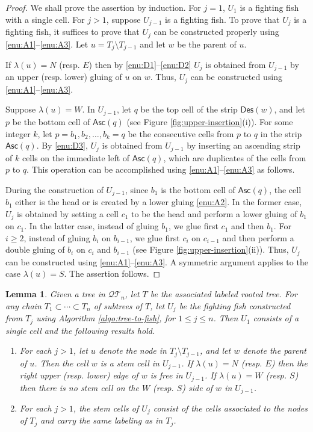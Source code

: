 \documentclass[a4paper,11pt,reqno]{amsart}
\newtheorem{lem}{Lemma}[section]
\theoremstyle{definition}
\numberwithin{equation}{section}
\newcommand{\Des}{{\textsf{Des}}}
\newcommand{\Asc}{{\textsf{Asc}}}
\newcommand{\QT}{{\mathcal{QT}}}
\begin{document}
\begin{proof} We shall prove the assertion by induction. For $j=1$, $U_1$ is a fighting fish with a single cell. For $j>1$, suppose $U_{j-1}$ is a fighting fish. To prove that $U_j$ is a fighting fish, it suffices to prove that $U_j$ can be constructed properly using \ref{enu:A1}--\ref{enu:A3}. Let $u=T_j\setminus T_{j-1}$ and let $w$ be the parent of $u$.

If $\lambda(u)=N$ (resp. $E$) then by \ref{enu:D1}--\ref{enu:D2} $U_j$ is obtained from $U_{j-1}$ by an upper (resp. lower) gluing of $u$ on $w$. Thus, $U_j$ can be constructed using \ref{enu:A1}--\ref{enu:A3}. 

Suppose $\lambda(u)=W$. In $U_{j-1}$, let $q$ be the top cell of the strip $\Des(w)$, and let $p$ be the bottom cell of $\Asc(q)$ (see Figure \ref{fig:upper-insertion}(i)). For some integer $k$, let $p=b_1, b_2,\dots, b_k=q$ be the consecutive cells from $p$ to $q$ in the strip $\Asc(q)$. By \ref{enu:D3}, $U_j$ is obtained from $U_{j-1}$ by inserting an ascending strip of $k$ cells on the immediate left of $\Asc(q)$, which are duplicates of the cells from $p$ to $q$. This operation can be accomplished using \ref{enu:A1}--\ref{enu:A3} as follows.

During the construction of $U_{j-1}$, since $b_1$ is the bottom cell of $\Asc(q)$, the cell $b_1$ either is the head or is created by a lower gluing \ref{enu:A2}. In the former case, $U_j$ is obtained by setting a cell $c_1$ to be the head and perform a lower gluing of $b_1$ on $c_1$. In the latter case, instead of gluing $b_1$, we glue first $c_1$ and then $b_1$. For $i\ge 2$, instead of gluing $b_i$ on $b_{i-1}$, we glue first $c_i$ on $c_{i-1}$ and then perform a double gluing of $b_i$ on $c_i$ and $b_{i-1}$ (see Figure \ref{fig:upper-insertion}(ii)).
Thus, $U_j$ can be constructed using \ref{enu:A1}--\ref{enu:A3}. A symmetric argument applies to the case $\lambda(u)=S$. The assertion follows.
\end{proof}



\begin{lem} \label{lem:cell-union}
Given a tree in $\QT_n$, let $T$ be the associated labeled rooted tree. For any chain $T_1\subset \cdots\subset T_n$ of subtrees of $T$, let $U_j$ be the fighting fish constructed from $T_j$ using Algorithm \ref{algo:tree-to-fish}, for $1\le j\le n$. Then $U_1$ consists of a single cell and the following results hold.
\begin{enumerate}
\item For each $j>1$, let $u$ denote the node in $T_j\setminus T_{j-1}$, and let $w$ denote the parent of $u$. Then the cell $w$ is a stem cell in $U_{j-1}$. If $\lambda(u)=N$ (resp. $E$) then the right upper (resp. lower) edge of $w$ is free in $U_{j-1}$. If $\lambda(u)=W$ (resp. $S$) then there is no stem cell on the $W$ (resp. $S$) side of $w$ in $U_{j-1}$.
\item For each $j>1$, the stem cells of $U_j$ consist of the cells associated to the nodes of $T_j$ and carry the same labeling as in $T_j$.
\end{enumerate}
\end{lem}
\end{document}
